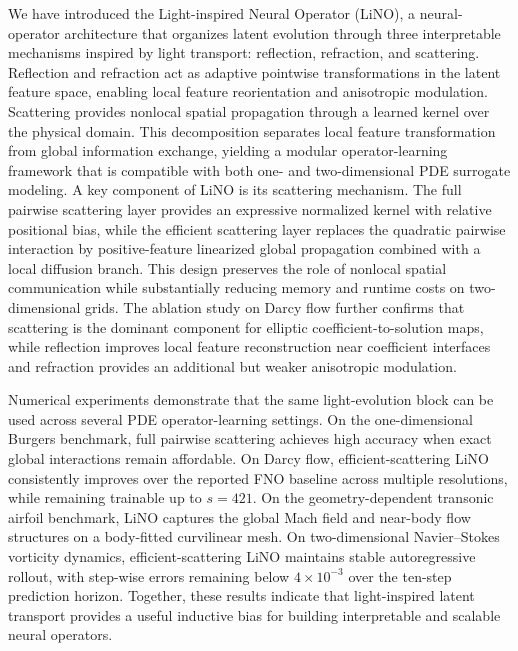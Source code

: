 \documentclass{article}
\begin{document}
We have introduced the Light-inspired Neural Operator (LiNO), a neural-operator architecture that organizes latent evolution through three interpretable mechanisms inspired by light transport: reflection, refraction, and scattering. 
Reflection and refraction act as adaptive pointwise transformations in the latent feature space, enabling local feature reorientation and anisotropic modulation. 
Scattering provides nonlocal spatial propagation through a learned kernel over the physical domain. 
This decomposition separates local feature transformation from global information exchange, yielding a modular operator-learning framework that is compatible with both one- and two-dimensional PDE surrogate modeling.
A key component of LiNO is its scattering mechanism. 
The full pairwise scattering layer provides an expressive normalized kernel with relative positional bias, while the efficient scattering layer replaces the quadratic pairwise interaction by positive-feature linearized global propagation combined with a local diffusion branch. 
This design preserves the role of nonlocal spatial communication while substantially reducing memory and runtime costs on two-dimensional grids. 
The ablation study on Darcy flow further confirms that scattering is the dominant component for elliptic coefficient-to-solution maps, while reflection improves local feature reconstruction near coefficient interfaces and refraction provides an additional but weaker anisotropic modulation.

Numerical experiments demonstrate that the same light-evolution block can be used across several PDE operator-learning settings. 
On the one-dimensional Burgers benchmark, full pairwise scattering achieves high accuracy when exact global interactions remain affordable. 
On Darcy flow, efficient-scattering LiNO consistently improves over the reported FNO baseline across multiple resolutions, while remaining trainable up to $s=421$. 
On the geometry-dependent transonic airfoil benchmark, LiNO captures the global Mach field and near-body flow structures on a body-fitted curvilinear mesh. 
On two-dimensional Navier--Stokes vorticity dynamics, efficient-scattering LiNO maintains stable autoregressive rollout, with step-wise errors remaining below $4\times10^{-3}$ over the ten-step prediction horizon. 
Together, these results indicate that light-inspired latent transport provides a useful inductive bias for building interpretable and scalable neural operators.
\end{document}
